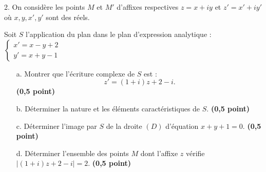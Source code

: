 \documentclass[12pt,a4paper]{article}
\begin{document}
\bigskip

2. On considère les points \( M \) et \( M' \) d’affixes respectives \( z = x + iy \) et \( z' = x' + iy' \) où \( x, y, x', y' \) sont des réels.

\bigskip

Soit \( S \) l’application du plan dans le plan d’expression analytique : \( \begin{cases}
    x' = x - y + 2 \\
    y' = x + y - 1
\end{cases} \)

\begin{enumerate}
    \item[a.] Montrer que l’écriture complexe de \( S \) est :  
          \[
          z' = (1 + i)z + 2 - i.
          \]
          \hfill \textbf{(0,5 point)}
          
    \item[b.] Déterminer la nature et les éléments caractéristiques de \( S \).  
          \hfill \textbf{(0,5 point)}
          
    \item[c.] Déterminer l’image par \( S \) de la droite \( (D) \) d’équation \( x + y + 1 = 0 \).  
          \hfill \textbf{(0,5 point)}
          
    \item[d.] Déterminer l’ensemble des points \( M \) dont l’affixe \( z \) vérifie \( |(1 + i)z + 2 - i| = 2 \).  
          \hfill \textbf{(0,5 point)}
\end{enumerate}
\end{document}
